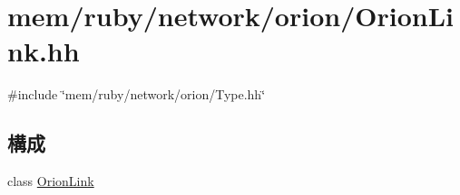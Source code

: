 \hypertarget{OrionLink_8hh}{
\section{mem/ruby/network/orion/OrionLink.hh}
\label{OrionLink_8hh}
}
{\ttfamily \#include \char`\"{}mem/ruby/network/orion/Type.hh\char`\"{}}\par
\subsection*{構成}
\begin{DoxyCompactItemize}
\item 
class \hyperlink{classOrionLink}{OrionLink}
\end{DoxyCompactItemize}
